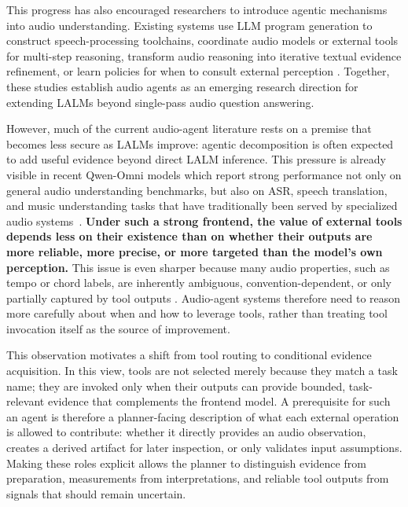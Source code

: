 \documentclass[11pt]{article}
\begin{document}
This progress has also encouraged researchers to introduce agentic mechanisms into audio understanding. Existing systems use LLM program generation to construct speech-processing toolchains, coordinate audio models or external tools for multi-step reasoning, transform audio reasoning into iterative textual evidence refinement, or learn policies for when to consult external perception \citep{kuan2024speechcopilot,lee2025audiomaestro,wijngaard2025audiotoolagent,rong2025audiogenie,chen2026audiorouter,tong2026autagent,wan2026speechhands,xiong2025thinkingwithsound,shao2026listeningwithtime}. Together, these studies establish audio agents as an emerging research direction for extending LALMs beyond single-pass audio question answering.

However, much of the current audio-agent literature rests on a premise that becomes less secure as LALMs improve: agentic decomposition is often expected to add useful evidence beyond direct LALM inference. This pressure is already visible in recent Qwen-Omni models which report strong performance not only on general audio understanding benchmarks, but also on ASR, speech translation, and music understanding tasks that have traditionally been served by specialized audio systems~\citep{xu2025qwen3,qwen2026qwen35omni}. \textbf{Under such a strong frontend, the value of external tools depends less on their existence than on whether their outputs are more reliable, more precise, or more targeted than the model's own perception.} This issue is even sharper because many audio properties, such as tempo or chord labels, are inherently ambiguous, convention-dependent, or only partially captured by tool outputs \citep{chiu2022analysis,koops2017chord}. Audio-agent systems therefore need to reason more carefully about when and how to leverage tools, rather than treating tool invocation itself as the source of improvement.

This observation motivates a shift from tool routing to conditional evidence acquisition. In this view, tools are not selected merely because they match a task name; they are invoked only when their outputs can provide bounded, task-relevant evidence that complements the frontend model. A prerequisite for such an agent is therefore a planner-facing description of what each external operation is allowed to contribute: whether it directly provides an audio observation, creates a derived artifact for later inspection, or only validates input assumptions. Making these roles explicit allows the planner to distinguish evidence from preparation, measurements from interpretations, and reliable tool outputs from signals that should remain uncertain.
\end{document}
